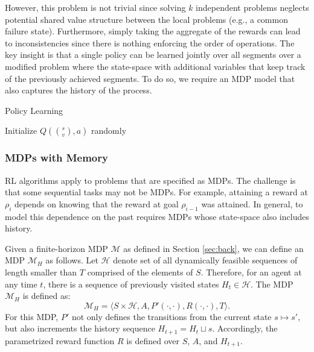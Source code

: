 However, this problem is not trivial since solving $k$ independent problems neglects potential shared value structure between the local problems (e.g., a common failure state).
Furthermore, simply taking the aggregate of the rewards can lead to inconsistencies since there is nothing enforcing the order of operations.
The key insight is that a single policy can be learned jointly over all segments over a modified problem where the state-space with additional variables that keep track of the previously achieved segments.
To do so, we require an MDP model that also captures the history of the process.


\begin{phase}[t]
\small
\DontPrintSemicolon
\caption{Policy Learning \label{alg:tsh3}}

Initialize $Q(\binom{s}{v},a)$ randomly


\end{phase}

\vspace{-15pt}
\subsubsection{MDPs with Memory}
RL algorithms apply to problems that are specified as MDPs.
The challenge is that some sequential tasks may not be MDPs.
For example, attaining a reward at $\rho_i$ depends on knowing that the reward at goal $\rho_{i-1}$ was attained.
In general, to model this dependence on the past requires MDPs whose state-space also includes history.

Given a finite-horizon MDP $\mathcal{M}$ as defined in Section \ref{sec:back}, we can define an MDP $\mathcal{M}_H$ as follows.
Let $\mathcal{H}$ denote set of all dynamically feasible sequences of length smaller than $T$ comprised of the elements of $S$.
Therefore, for an agent at any time $t$, there is a sequence of previously visited states $H_t \in \mathcal{H}$.
The MDP $\mathcal{M}_H$ is defined as:
\[
\mathcal{M}_H = \langle S \times \mathcal{H},A,P'(\cdot,\cdot), R(\cdot,\cdot),T \rangle.
\]
For this MDP, $P'$ not only defines the transitions from the current state $s \mapsto s'$, but also increments the history sequence $H_{t+1} = H_{t} \sqcup s$.
Accordingly, the parametrized reward function $R$ is defined over $S$, $A$, and $H_{t+1}$.

